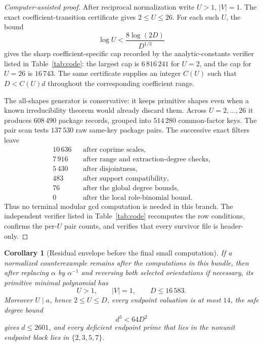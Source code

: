 \documentclass[11pt]{article}
\numberwithin{equation}{section}
\newtheorem{corollary}[theorem]{Corollary}
\theoremstyle{definition}
\begin{document}
\begin{proof}[Computer-assisted proof]
After reciprocal normalization write \(U>1\), \(|V|=1\).  The exact
coefficient-transition certificate gives \(2\leq U\leq26\).  For each such
\(U\), the bound
\[
 \log U<\frac{8\log(2D)}{D^{1/3}}
\]
gives the sharp coefficient-specific cap recorded by the
analytic-constants verifier listed in Table~\ref{tab:code}: the largest cap
is \(6\,816\,241\) for \(U=2\), and the cap for \(U=26\) is \(16\,743\).
The same certificate supplies an integer \(C(U)\) such that \(D<C(U)d\)
throughout the corresponding coefficient range.

The all-shapes generator is conservative: it keeps primitive shapes even
when a known irreducibility theorem would already discard them.  Across
\(U=2,\ldots,26\) it produces \(608\,490\) package records, grouped into
\(514\,280\) common-factor keys.  The pair scan tests \(137\,530\) raw
same-key package pairs.  The successive exact filters leave
\[
\begin{array}{rcl}
10\,636 && \text{after coprime scales},\\
 7\,916 && \text{after range and extraction-degree checks},\\
 5\,430 && \text{after disjointness},\\
   483 && \text{after support compatibility},\\
    76 && \text{after the global degree bounds},\\
     0 && \text{after the local role-binomial bound}.
\end{array}
\]
Thus no terminal modular gcd computation is needed in this branch.  The
independent verifier listed in Table~\ref{tab:code} recomputes the row
conditions, confirms the per-\(U\) pair counts, and verifies that every
survivor file is header-only.
\end{proof}

\begin{corollary}[Residual envelope before the final small computation]
\label{cor:q12residualenvelope}
If a normalized counterexample remains after the computations in this
bundle, then after replacing \(\alpha\) by \(\alpha^{-1}\) and reversing both
selected orientations if necessary, its primitive minimal polynomial has
\[
 U>1,
 \qquad |V|=1,
 \qquad D\leq16\,583.
\]
Moreover \(U\mid a\), hence \(2\leq U\leq D\), every endpoint valuation is at
most \(14\), the safe degree bound
\[
 d^3<64D^2
\]
gives \(d\leq2601\), and every deficient endpoint prime that lies in the
nonunit endpoint block lies in \(\{2,3,5,7\}\).
\end{corollary}
\end{document}
